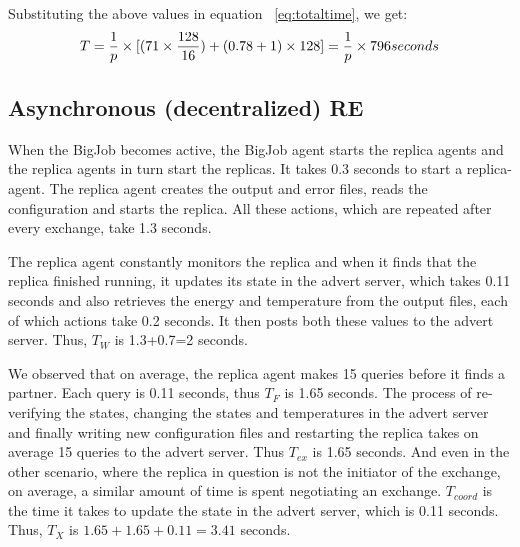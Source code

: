 \documentclass{rspublic}
\begin{document}


Substituting the above values in equation ~\ref{eq:totaltime}, we get:
\begin{eqnarray}
T=  {1 \over p} \times {[ {(71\times {128\over 16}}) + (0.78 + 1)\times 128]} = {1 \over p} \times 796 seconds
\label{eq:cent}
\end{eqnarray}


\subsection{Asynchronous (decentralized) RE}

When the BigJob becomes active, the BigJob agent starts the replica
agents and the replica agents in turn start the replicas. It takes 0.3
seconds to start a replica-agent.  The replica agent creates the
output and error files, reads the configuration and starts the
replica. All these actions, which are repeated after every exchange,
take 1.3 seconds.

The replica agent constantly monitors the replica and when it finds
that the replica finished running, it updates its state in the advert
server, which takes 0.11 seconds and also retrieves the energy and
temperature from the output files, each of which actions take 0.2
seconds. It then posts both these values to the advert server. Thus,
$T_W$ is 1.3+0.7=2 seconds.

We observed that on average, the replica agent makes 15 queries before
it finds a partner. Each query is 0.11 seconds, thus $T_F$ is 1.65
seconds. The process of re-verifying the states, changing the states
and temperatures in the advert server and finally writing new
configuration files and restarting the replica takes on average 15
queries to the advert server. Thus $T_{ex}$ is 1.65 seconds. And even
in the other scenario, where the replica in question is not the
initiator of the exchange, on average, a similar amount of time is
spent negotiating an exchange.  $T_{coord}$ is the time it takes to
update the state in the advert server, which is 0.11 seconds. Thus,
$T_{X}$ is $1.65+1.65+0.11= 3.41$ seconds.
\end{document}
